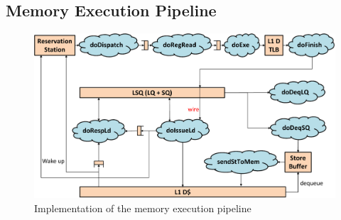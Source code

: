\subsection{Memory Execution Pipeline}

\begin{figure}
    \centering
    \includegraphics[width=\columnwidth]{fig/mem_exe_crop.pdf}
    \caption{Implementation of the memory execution pipeline}\label{fig:mem-exe-pipe-impl}
\end{figure}

